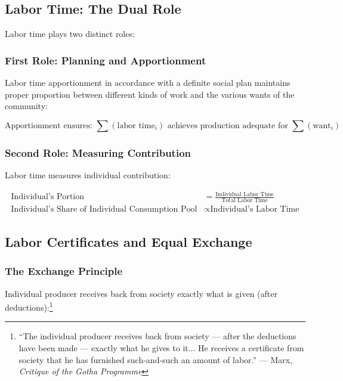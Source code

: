 \documentclass[12pt,a4paper]{article}
\begin{document}
\subsection{Labor Time: The Dual Role}

Labor time plays two distinct roles:

\subsubsection{First Role: Planning and Apportionment}

Labor time apportionment in accordance with a definite social plan maintains proper proportion between different kinds of work and the various wants of the community:

\begin{equation}
\text{Apportionment ensures: } \sum(\text{labor time}_i) \text{ achieves production adequate for } \sum(\text{want}_i)
\end{equation}

\subsubsection{Second Role: Measuring Contribution}

Labor time measures individual contribution:

\begin{align}
\text{Individual's Portion} &= \frac{\text{Individual Labor Time}}{\text{Total Labor Time}} \\
\text{Individual's Share of Individual Consumption Pool} &\propto \text{Individual's Labor Time}
\end{align}

\subsection{Labor Certificates and Equal Exchange}

\subsubsection{The Exchange Principle}

Individual producer receives back from society exactly what is given (after deductions):\footnote{``The individual producer receives back from society — after the deductions have been made — exactly what he gives to it... He receives a certificate from society that he has furnished such-and-such an amount of labor.'' --- Marx, \textit{Critique of the Gotha Programme}}
\end{document}
